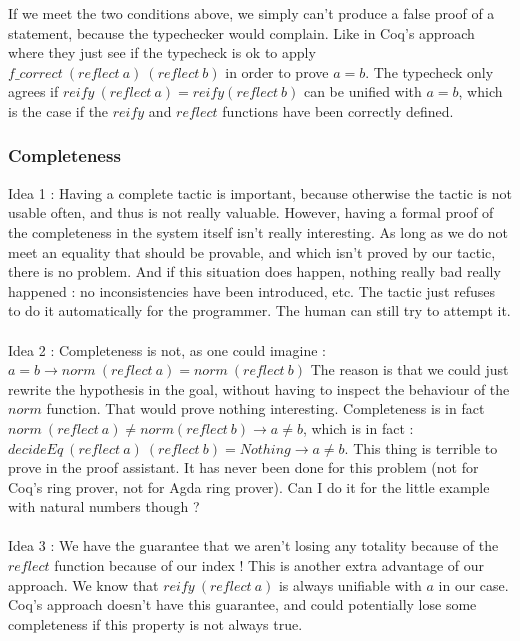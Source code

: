 If we meet the two conditions above, we simply can't produce a false proof of a statement, because the typechecker would complain. Like in Coq's approach where they just see if the typecheck is ok to apply $f\_correct\ (reflect\ a)\ (reflect\ b)$ in order to prove $a=b$. The typecheck only agrees if $reify\ (reflect\ a) = reify(reflect\ b)$ can be unified with $a=b$, which is the case if the $reify$ and $reflect$ functions have been correctly defined.
		
		\subsubsection{Completeness}
		
Idea 1 : Having a complete tactic is important, because otherwise the tactic is not usable often, and thus is not really valuable. However, having a formal proof of the completeness in the system itself isn't really interesting. As long as we do not meet an equality that should be provable, and which isn't proved by our tactic, there is no problem. And if this situation does happen, nothing really bad really happened : no inconsistencies have been introduced, etc. The tactic just refuses to do it automatically for the programmer. The human can still try to attempt it. \\
\\
Idea 2 : Completeness is not, as one could imagine : \\
$a=b \rightarrow norm\ (reflect\ a) = norm\ (reflect\ b)$
The reason is that we could just rewrite the hypothesis in the goal, without having to inspect the behaviour of the $norm$ function. That would prove nothing interesting.
Completeness is in fact $norm\ (reflect\ a) \neq norm(reflect\ b) \rightarrow a \neq b$, which is in fact :
$decideEq\ (reflect\ a)\ (reflect\ b) = Nothing \rightarrow a \neq b$.
This thing is terrible to prove in the proof assistant. It has never been done for this problem (not for Coq's ring prover, not for Agda ring prover). Can I do it for the little example with natural numbers though ? \\
\\
Idea 3 : We have the guarantee that we aren't losing any totality because of the $reflect$ function because of our index ! This is another extra advantage of our approach. We know that $reify\ (reflect\ a)$ is always unifiable with $a$ in our case. Coq's approach doesn't have this guarantee, and could potentially lose some completeness if this property is not always true.